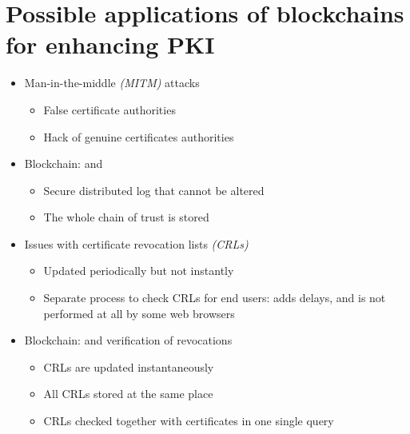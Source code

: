 \section[Blockchains for PKI]{Possible applications of blockchains for enhancing PKI}




\begin{frame}
\begin{itemize}
\item Man-in-the-middle \emph{(MITM)} attacks
\begin{itemize}
\item False certificate authorities
\item Hack of genuine certificates authorities
\end{itemize}
\vspace{2mm}
\item Blockchain:  and 
\begin{itemize}
\item Secure distributed log that cannot be altered
\item The whole chain of trust is stored
\end{itemize}
\end{itemize}
\end{frame}

\begin{frame}
\begin{itemize}
\item Issues with certificate revocation lists \emph{(CRLs)}
\begin{itemize}
\item Updated periodically but not instantly
\item Separate process to check CRLs for end users: adds delays, and is not performed at all by some web browsers
\end{itemize}
\vspace{2mm}
\item Blockchain:  and  verification of revocations
\begin{itemize}
\item CRLs are updated instantaneously
\item All CRLs stored at the same place
\item CRLs checked together with certificates in one single query
\end{itemize}
\end{itemize}
\end{frame}

